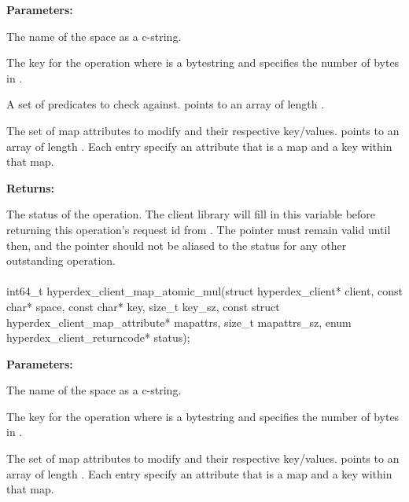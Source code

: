 \noindent\textbf{Parameters:}
\begin{description}[labelindent=\widthof{{\code{mapattrs}, \code{mapattrs\_sz}}},leftmargin=*,noitemsep,nolistsep,align=right]
\item[\code{space}] The name of the space as a c-string.
\item[\code{key}, \code{key\_sz}] The key for the operation where  is a bytestring and  specifies the number of bytes in .
\item[\code{checks}, \code{checks\_sz}] A set of predicates to check against.   points to an array of length .
\item[\code{mapattrs}, \code{mapattrs\_sz}] The set of map attributes to modify and their respective key/values.   points to an array of length .  Each entry specify an attribute that is a map and a key within that map.
\end{description}

\noindent\textbf{Returns:}
\begin{description}[labelindent=\widthof{{\code{status}}},leftmargin=*,noitemsep,nolistsep,align=right]
\item[\code{status}] The status of the operation.  The client library will fill in this variable before returning this operation's request id from .  The pointer must remain valid until then, and the pointer should not be aliased to the status for any other outstanding operation.
\end{description}

\paragraph{}
\begin{ccode}
int64_t hyperdex_client_map_atomic_mul(struct hyperdex_client* client,
                const char* space,
                const char* key, size_t key_sz,
                const struct hyperdex_client_map_attribute* mapattrs, size_t mapattrs_sz,
                enum hyperdex_client_returncode* status);
\end{ccode}
\funcdesc 

\noindent\textbf{Parameters:}
\begin{description}[labelindent=\widthof{{\code{mapattrs}, \code{mapattrs\_sz}}},leftmargin=*,noitemsep,nolistsep,align=right]
\item[\code{space}] The name of the space as a c-string.
\item[\code{key}, \code{key\_sz}] The key for the operation where  is a bytestring and  specifies the number of bytes in .
\item[\code{mapattrs}, \code{mapattrs\_sz}] The set of map attributes to modify and their respective key/values.   points to an array of length .  Each entry specify an attribute that is a map and a key within that map.
\end{description}

